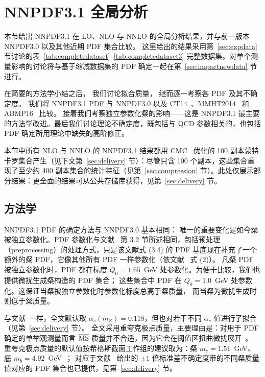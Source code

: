 \newpage
\section{NNPDF3.1 全局分析}

\label{sec:results}

本节给出 NNPDF3.1 在 LO、NLO 与 NNLO 的全局分析结果，并与前一版本
NNPDF3.0 以及其他近期 PDF 集合比较。
%
这里给出的结果采用第~\ref{sec:expdata} 节讨论的表~\ref{tab:completedataset}--\ref{tab:completedataset3}
完整数据集。对单个测量影响的讨论将与基于缩减数据集的 PDF 确定一起在第~\ref{sec:impactnewdata} 节进行。

在简要的方法学小结之后，
我们讨论拟合质量，
继而逐一考察各 PDF 及其不确定度。
我们将 NNPDF3.1 PDF 与 NNPDF3.0 以及 CT14~\cite{Dulat:2015mca}、MMHT2014~\cite{Harland-Lang:2014zoa}
和 ABMP16~\cite{Alekhin:2017kpj} 比较。
接着我们考察独立参数化粲的影响——这是 NNPDF3.1 最主要的方法学改进。最后我们讨论理论不确定度，既包括与 QCD 参数相关的，也包括 PDF 确定所用理论中缺失的高阶修正。

本节中所有 NLO 与 NNLO 的 NNPDF3.1 结果都用 CMC~\cite{Carrazza:2015hva}
优化的 100 副本蒙特卡罗集合产生（见下文第~\ref{sec:delivery} 节）：尽管只含 100 个副本，这些集合重现了至少约 400 副本集合的统计特征（见第~\ref{sec:compression} 节）。此处仅展示部分结果：更全面的结果可从公共存储库获得，见第~\ref{sec:delivery} 节。

\subsection{方法学}
\label{sec:methodology}

NNPDF3.1 PDF 的确定方法与 NNPDF3.0 基本相同：
唯一的重要变化是如今粲被独立参数化。PDF 参数化与文献~\cite{Ball:2014uwa}
第 3.2 节所述相同，包括预处理（preprocessing）的处理方式，只是该文献式 (3.4) 的 PDF
基底现在补充了一个额外的粲 PDF，它像其他所有 PDF 一样参数化（依文献~\cite{Ball:2016neh} 式 (2)）。
凡粲 PDF 被独立参数化时，PDF 都在标度 $Q_0=1.65$~GeV 处参数化。为便于比较，我们也提供微扰生成粲构造的 PDF 集合；
这些集合中 PDF 在 $Q_0=1.0$~GeV 处参数化。这保证当粲被独立参数化时参数化标度总高于粲质量，
而当粲为微扰生成时则低于粲质量。

与文献~\cite{Ball:2014uwa}一样，全文默认取 $\alpha_s(m_Z)=0.118$，但也对若干不同 $\alpha_s$ 值进行了拟合（见第~\ref{sec:delivery} 节）。
全文采用重夸克极点质量，主要理由是：对用于 PDF 确定的单举观测量而言 $\overline{\rm MS}$ 质量并不合适，因为它会在阈值区扭曲微扰展开~\cite{Ball:2016qeg}。
重夸克极点质量的默认值按希格斯截面工作组的建议取为：粲 $m_c=1.51$~GeV、底 $m_b=4.92$~GeV~\cite{deFlorian:2016spz}；
对应于文献~\cite{deFlorian:2016spz} 给出的 $\pm 1$ 倍标准差不确定度带的不同粲质量值对应的 PDF 集合也已提供，见第~\ref{sec:delivery} 节。


